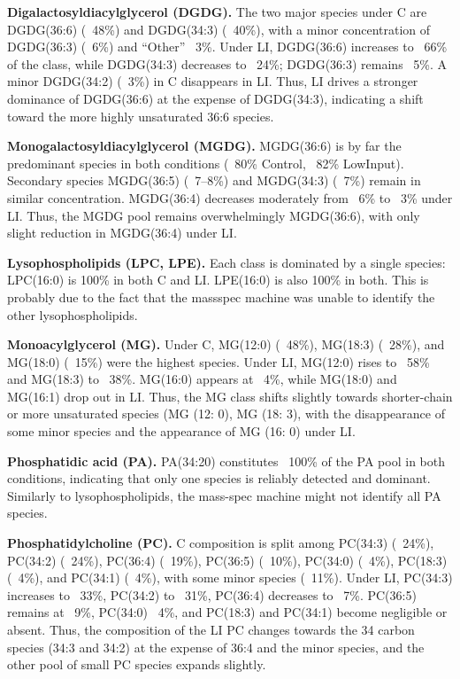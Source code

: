 \documentclass[10pt,letterpaper]{article}
\begin{document}
\textbf{Digalactosyldiacylglycerol (DGDG).}  
The two major species under C are DGDG(36:6) (~48\%) and DGDG(34:3) (~40\%), with a minor concentration of DGDG(36:3) (~6\%) and “Other” ~3\%. Under LI, DGDG(36:6) increases to ~66\% of the class, while DGDG(34:3) decreases to ~24\%; DGDG(36:3) remains ~5\%. A minor DGDG(34:2) (~3\%) in C disappears in LI. Thus, LI drives a stronger dominance of DGDG(36:6) at the expense of DGDG(34:3), indicating a shift toward the more highly unsaturated 36:6 species.

\textbf{Monogalactosyldiacylglycerol (MGDG).}  
MGDG(36:6) is by far the predominant species in both conditions (~80\% Control, ~82\% LowInput). Secondary species MGDG(36:5) (~7–8\%) and MGDG(34:3) (~7\%) remain in similar concentration. MGDG(36:4) decreases moderately from ~6\% to ~3\% under LI. Thus, the MGDG pool remains overwhelmingly MGDG(36:6), with only slight reduction in MGDG(36:4) under LI.

\textbf{Lysophospholipids (LPC, LPE).}  
Each class is dominated by a single species: LPC(16:0) is 100\% in both C and LI. LPE(16:0) is also 100\% in both. This is probably due to the fact that the massspec machine was unable to identify the other lysophospholipids. 

\textbf{Monoacylglycerol (MG).}  
Under C, MG(12:0) (~48\%), MG(18:3) (~28\%), and MG(18:0) (~15\%) were the highest species. Under LI, MG(12:0) rises to ~58\% and MG(18:3) to ~38\%. MG(16:0) appears at ~4\%, while MG(18:0) and MG(16:1) drop out in LI. Thus, the MG class shifts slightly towards shorter-chain or more unsaturated species (MG (12: 0), MG (18: 3), with the disappearance of some minor species and the appearance of MG (16: 0) under LI.

\textbf{Phosphatidic acid (PA).}  
PA(34:20) constitutes ~100\% of the PA pool in both conditions, indicating that only one species is reliably detected and dominant. Similarly to lysophospholipids, the mass-spec machine might not identify all PA species. 

\textbf{Phosphatidylcholine (PC).}  
C composition is split among PC(34:3) (~24\%), PC(34:2) (~24\%), PC(36:4) (~19\%), PC(36:5) (~10\%), PC(34:0) (~4\%), PC(18:3) (~4\%), and PC(34:1) (~4\%), with some minor species (~11\%). Under LI, PC(34:3) increases to ~33\%, PC(34:2) to ~31\%, PC(36:4) decreases to ~7\%. PC(36:5) remains at ~9\%, PC(34:0) ~4\%, and PC(18:3) and PC(34:1) become negligible or absent. Thus, the composition of the LI PC changes towards the 34 carbon species (34:3 and 34:2) at the expense of 36:4 and the minor species, and the other pool of small PC species expands slightly.
\end{document}
